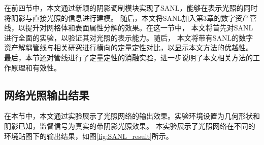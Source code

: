 在前四节中，本文通过新颖的阴影调制模块实现了SANL，能够在表示光照的同时将阴影与直接光照的信息进行建模。
随后，本文将SANL加入第3章的数字资产管线，以提升对网格体和表面属性分解的效果。在这一节中，
本文将首先对SANL进行全面的实验，以验证其对光照的表示能力。随后，
本文将带有SANL的数字资产解耦管线与相关研究进行横向的定量定性对比，以显示本文方法的优越性。
最后，本节还对管线进行了定量定性的消融实验，进一步说明了本文相关方法的工作原理和有效性。

\subsection{网络光照输出结果}
在本节中，本文通过实验展示了光照网络的输出效果。实验环境设置为几何形状和阴影已知，监督信号为真实的带阴影光照效果。
本实验展示了光照网络在不同的环境贴图下的输出结果，如图\ref{fig:SANL_result}所示。

